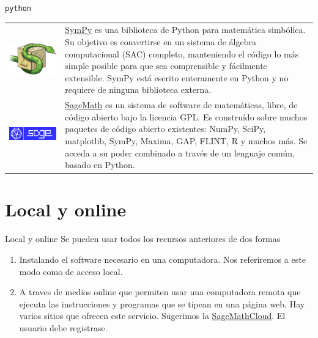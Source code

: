 \documentclass[handout,hyperref={colorlinks=true}]{beamer}
\begin{document}
\begin{frame}{\texttt{python}}
\begin{tabular}{m{.2\linewidth} m{.8\linewidth} }
\includegraphics[scale=.25]{imagenes/sympy_logo.png} & \href{http://www.sympy.org/}{SymPy} 
es una biblioteca de Python para matemática simbólica. Su objetivo es convertirse en un sistema de álgebra computacional (SAC) completo, manteniendo el código lo más simple posible para que sea comprensible y fácilmente extensible. SymPy está escrito enteramente en Python y no requiere de ninguna biblioteca externa.\\

\includegraphics[scale=.13]{imagenes/sage_logo.png} & \href{http://www.sagemath.org/}{SageMath}  es un sistema de software de matemáticas, libre, de código abierto bajo la licencia GPL. Es construído sobre  muchos paquetes de código abierto existentes: NumPy, SciPy, matplotlib, SymPy, Maxima, GAP, FLINT, R y muchos más. Se acceda a su poder combinado a través de un lenguaje común, basado en Python.
\end{tabular}

\end{frame}

\section{Local y online} 

\begin{frame}{Local y online}
\onslide<+->Se pueden usar todos los recursos anteriores de dos formas 
\begin{enumerate}
\item<+-> Instalando el software necesario en una computadora. Nos referiremos a este modo como de acceso local.

\item<+-> A traves de medios online que permiten usar una computadora remota que ejecuta las instrucciones y programas que se tipean en una página web.  Hay varios sitios que ofrecen este servicio. Sugerimos la \href{https://cloud.sagemath.com/}{SageMathCloud}. El usuario debe registrase.
\end{enumerate}
\end{frame}
\end{document}
